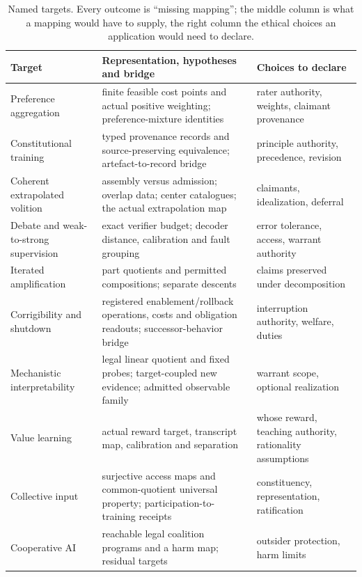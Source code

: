\documentclass[pdflatex,sn-basic]{sn-jnl}%
\newcommand{\tablerows}{\renewcommand{\arraystretch}{1.6}}%
\begin{document}
\begin{appendices}
\begin{table}[!htbp]
  \centering\scriptsize
  \caption{Named targets. Every outcome is ``missing mapping''; the middle column is what a mapping would have to supply, the right column the ethical choices an application would need to declare.}
  \label{tab:register-targets}
  \tablerows
  \begin{tabularx}{\textwidth}{@{}>{\raggedright\arraybackslash}p{2.6cm}>{\raggedright\arraybackslash}X>{\raggedright\arraybackslash}p{3.6cm}@{}}
    \toprule
    Target & Representation, hypotheses and bridge & Choices to declare\\
    \midrule
    Preference aggregation & finite feasible cost points and actual positive weighting; preference-mixture identities & rater authority, weights, claimant provenance\\
    Constitutional training & typed provenance records and source-preserving equivalence; artefact-to-record bridge & principle authority, precedence, revision\\
    Coherent extrapolated volition & assembly versus admission; overlap data; center catalogues; the actual extrapolation map & claimants, idealization, deferral\\
    Debate and weak-to-strong supervision & exact verifier budget; decoder distance, calibration and fault grouping & error tolerance, access, warrant authority\\
    Iterated amplification & part quotients and permitted compositions; separate descents & claims preserved under decomposition\\
    Corrigibility and shutdown & registered enablement/rollback operations, costs and obligation readouts; successor-behavior bridge & interruption authority, welfare, duties\\
    Mechanistic interpretability & legal linear quotient and fixed probes; target-coupled new evidence; admitted observable family & warrant scope, optional realization\\
    Value learning & actual reward target, transcript map, calibration and separation & whose reward, teaching authority, rationality assumptions\\
    Collective input & surjective access maps and common-quotient universal property; participation-to-training receipts & constituency, representation, ratification\\
    Cooperative AI & reachable legal coalition programs and a harm map; residual targets & outsider protection, harm limits\\

\end{tabularx}
\end{table}
\end{appendices}
\end{document}
